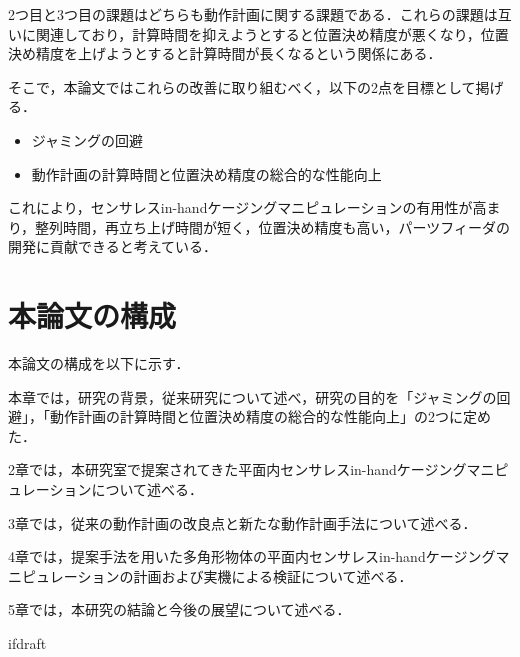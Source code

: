 \documentclass[a4paper,twoside,12pt,papersize, dvipdfmx]{iirthesis}
\begin{document}
2つ目と3つ目の課題はどちらも動作計画に関する課題である．これらの課題は互いに関連しており，計算時間を抑えようとすると位置決め精度が悪くなり，位置決め精度を上げようとすると計算時間が長くなるという関係にある．

そこで，本論文ではこれらの改善に取り組むべく，以下の2点を目標として掲げる．
\begin{itemize}
\item ジャミングの回避
\item 動作計画の計算時間と位置決め精度の総合的な性能向上
\end{itemize}
これにより，センサレスin-handケージングマニピュレーションの有用性が高まり，整列時間，再立ち上げ時間が短く，位置決め精度も高い，パーツフィーダの開発に貢献できると考えている．

\section{本論文の構成}\label{sec::intro::configuration}
本論文の構成を以下に示す．\par
本章では，研究の背景，従来研究について述べ，研究の目的を「ジャミングの回避」，「動作計画の計算時間と位置決め精度の総合的な性能向上」の2つに定めた．\par
2章では，本研究室で提案されてきた平面内センサレスin-handケージングマニピュレーションについて述べる．\par
3章では，従来の動作計画の改良点と新たな動作計画手法について述べる．\par
4章では，提案手法を用いた多角形物体の平面内センサレスin-handケージングマニピュレーションの計画および実機による検証について述べる．\par
5章では，本研究の結論と今後の展望について述べる．


\expandafter\ifx\csname ifdraft\endcsname\relax
    
\end{document}
